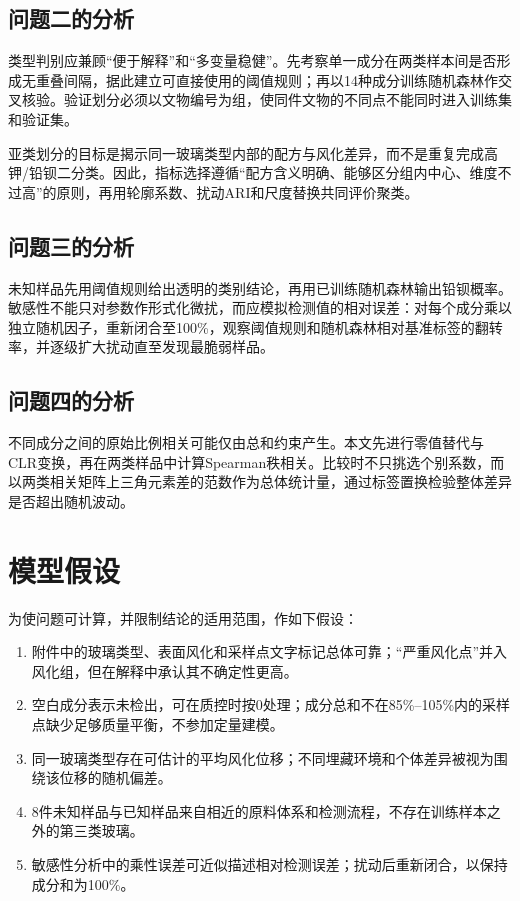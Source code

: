 \documentclass[UTF8,a4paper,zihao=-4,fontset=windows]{ctexart}
\begin{document}
\subsection{问题二的分析}

类型判别应兼顾“便于解释”和“多变量稳健”。先考察单一成分在两类样本间是否形成无重叠间隔，据此建立可直接使用的阈值规则；再以14种成分训练随机森林作交叉核验。验证划分必须以文物编号为组，使同件文物的不同点不能同时进入训练集和验证集。

亚类划分的目标是揭示同一玻璃类型内部的配方与风化差异，而不是重复完成高钾/铅钡二分类。因此，指标选择遵循“配方含义明确、能够区分组内中心、维度不过高”的原则，再用轮廓系数、扰动ARI和尺度替换共同评价聚类。

\subsection{问题三的分析}

未知样品先用阈值规则给出透明的类别结论，再用已训练随机森林输出铅钡概率。敏感性不能只对参数作形式化微扰，而应模拟检测值的相对误差：对每个成分乘以独立随机因子，重新闭合至100\%，观察阈值规则和随机森林相对基准标签的翻转率，并逐级扩大扰动直至发现最脆弱样品。

\subsection{问题四的分析}

不同成分之间的原始比例相关可能仅由总和约束产生。本文先进行零值替代与CLR变换，再在两类样品中计算Spearman秩相关。比较时不只挑选个别系数，而以两类相关矩阵上三角元素差的范数作为总体统计量，通过标签置换检验整体差异是否超出随机波动。

\section{模型假设}

为使问题可计算，并限制结论的适用范围，作如下假设：

\begin{enumerate}
  \item 附件中的玻璃类型、表面风化和采样点文字标记总体可靠；“严重风化点”并入风化组，但在解释中承认其不确定性更高。
  \item 空白成分表示未检出，可在质控时按0处理；成分总和不在85\%--105\%内的采样点缺少足够质量平衡，不参加定量建模。
  \item 同一玻璃类型存在可估计的平均风化位移；不同埋藏环境和个体差异被视为围绕该位移的随机偏差。
  \item 8件未知样品与已知样品来自相近的原料体系和检测流程，不存在训练样本之外的第三类玻璃。
  \item 敏感性分析中的乘性误差可近似描述相对检测误差；扰动后重新闭合，以保持成分和为100\%。
\end{enumerate}
\end{document}
